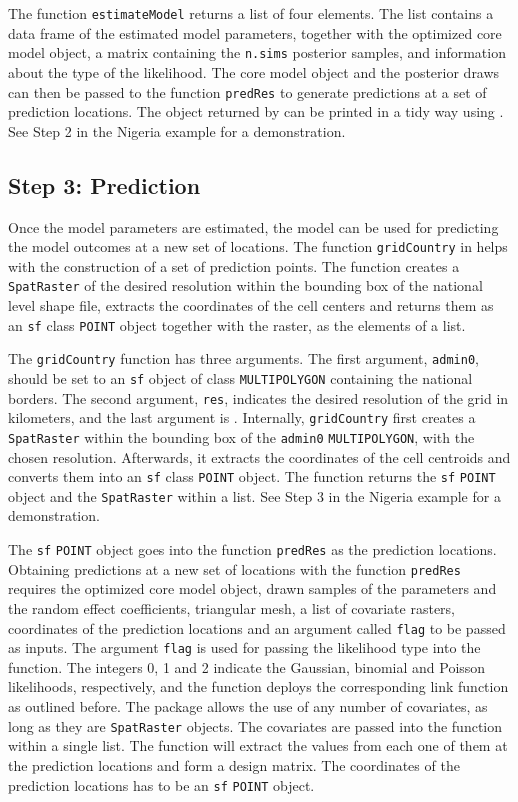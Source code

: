 The function \texttt{estimateModel} returns a list of four elements. The list contains a data frame of the estimated model parameters, together with the optimized core model object, a matrix containing the \texttt{n.sims} posterior samples, and information about the type of the likelihood. The core model object and the posterior draws can then be passed to the function \texttt{predRes} to generate predictions at a set of prediction locations. The object returned by  can be printed in a tidy way using . See Step 2 in the Nigeria example for a demonstration.

\subsection{Step 3: Prediction}
Once the model parameters are estimated, the model can be used for predicting the model outcomes at a new set of locations. The function \texttt{gridCountry} in  helps with the construction of a set of prediction points. The function creates a \texttt{SpatRaster} of the desired resolution within the bounding box of the national level shape file, extracts the coordinates of the cell centers and returns them as an \texttt{sf} class \texttt{POINT} object together with the raster, as the elements of a list. 

The \texttt{gridCountry} function has three arguments. The first argument, \texttt{admin0}, should be set to an \texttt{sf} object of class \texttt{MULTIPOLYGON} containing the national borders. The second argument, \texttt{res}, indicates the desired resolution of the grid in kilometers, and the last argument is . Internally, \texttt{gridCountry} first creates a \texttt{SpatRaster} within the bounding box of the \texttt{admin0} \texttt{MULTIPOLYGON}, with the chosen resolution. Afterwards, it extracts the coordinates of the cell centroids and converts them into an \texttt{sf} class \texttt{POINT} object. The function returns the \texttt{sf} \texttt{POINT} object and the \texttt{SpatRaster} within a list. See Step 3 in the Nigeria example for a demonstration. 

The \texttt{sf} \texttt{POINT} object goes into the function \texttt{predRes} as the prediction locations.
Obtaining predictions at a new set of locations with the function {\tt predRes} requires the optimized core model object, drawn samples of the parameters and the random effect coefficients, triangular mesh, a list of covariate rasters, coordinates of the prediction locations and an argument called \texttt{flag} to be passed as inputs. The argument \texttt{flag} is used for passing the likelihood type into the function. The integers 0, 1 and 2 indicate the Gaussian, binomial and Poisson likelihoods, respectively, and the function deploys the corresponding link function as outlined before. The package allows the use of any number of covariates, as long as they are \texttt{SpatRaster} objects. The covariates are passed into the function within a single list. The function will extract the values from each one of them at the prediction locations and form a design matrix.  The coordinates of the prediction locations has to be an \texttt{sf} \texttt{POINT} object.

